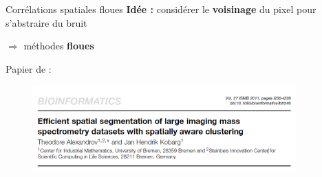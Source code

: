 \documentclass[10pt]{beamer}
\begin{document}
\begin{frame}{Corrélations spatiales floues}
  \textbf{Idée :} considérer le \textbf{voisinage} du pixel pour s'abstraire du bruit

  $\Rightarrow$ méthodes \textbf{floues} \vspace{0.4cm}

  Papier de \cite{Alexandrov11} :

  \begin{figure}[ht]
    \centering
    \includegraphics[width=0.9\textwidth]{fig/article_front}
    \caption{}
    \label{fig:article_front}
  \end{figure}
  
\end{frame}
\end{document}
